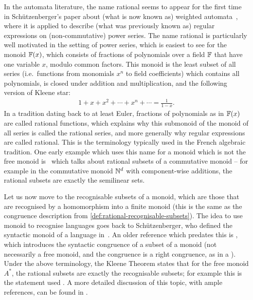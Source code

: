 In the automata literature, the name rational seems to appear for the first time in Sch\"utzenberger's paper about (what is now known as) weighted automata~\cite[Section III.A]{Schutzenberger1961OnTheDefinition}, where it is applied to describe (what was previously known as) regular expressions on (non-commutative) power series. The name rational is particularly well motivated in the setting of power series, which is easiest to see for the monoid   $\mathbb F(x)$, which consists of fractions of polynomials over a field $\mathbb F$ that have one variable $x$, modulo common factors. This monoid is the least subset of all series (i.e.~functions from monomials $x^n$ to field coefficients) which contains all polynomials, is closed under addition and multiplication, and the following version of Kleene star:
        \begin{align*}
        1 + x + x^2 + \cdots + x^n + \cdots = \frac{1}{1-x}.
        \end{align*}
In a tradition dating back to at least Euler,  fractions of polynomials as in $\mathbb F(x)$ are called rational functions, which explains why this submonoid of the monoid of all series is called the rational series, and more generally why regular expressions are called rational. This is the terminology typically used in the French algebraic tradition. One early example which uses this name for a monoid which is not the free monoid is~\cite{eilenbergSchutzenberger1969} which talks about rational subsets of a commutative monoid -- for example in the commutative monoid ${\mathbb N}^d$ with component-wise additions, the rational subsets are exactly the semilinear sets. 

Let us now move to the recognisable subsets of a monoid, which are those that are recognised by a homomorphism into a finite monoid (this is the same as the congruence description from \cref{def:rational-recognisable-subsets}). The idea to use monoid to recognise languages goes back to Sch\"utzenberger, who defined the  syntactic monoid of a language in~\cite[p.~10]{schutzenberger1956}. An older reference which predates this is \cite[Theorem 3]{dubreil1941}, which introduces the syntactic congruence of a subset of a monoid (not necessarily a free monoid, and the congruence is a right congruence, as in a \dfa). Under the above terminology, the Kleene Theorem states that for the free monoid $A^*$, the rational subsets are exactly the recognisable subsets; for example this is the statement used \cite[Chapter III, Theorem 2.1]{berstel1979}. A more detailed discussion of this topic, with ample references, can be found in \cite{Sakarovitch2021Automata}. 

